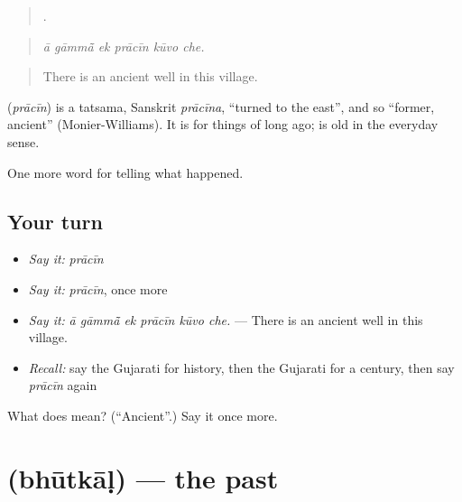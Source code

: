 \begin{quote}
     .
\end{quote}

\begin{quote}
\emph{ā gāmmā̃ ek prācīn kūvo che.}
\end{quote}

\begin{quote}
There is an ancient well in this village.
\end{quote}

\begin{cousinweb}
\textbf{} (\emph{prācīn}) is a tatsama, Sanskrit \emph{prācīna}, \textquotedblleft{}turned to the east\textquotedblright{}, and so \textquotedblleft{}former, ancient\textquotedblright{} (Monier-Williams). It is for things of long ago; \textbf{} is old in the everyday sense.
\end{cousinweb}

\begin{grammarlens}[title={What you've built}]
One more word for telling what happened.
\end{grammarlens}

\subsection*{Your turn}
\begin{itemize}
\raggedright
  \item \emph{Say it:} \emph{prācīn}
  \item \emph{Say it:} \emph{prācīn}, once more
  \item \emph{Say it:} \emph{ā gāmmā̃ ek prācīn kūvo che.} — There is an ancient well in this village.
  \item \emph{Recall:} say the Gujarati for history, then the Gujarati for a century, then say \emph{prācīn} again
\end{itemize}

\begin{tcolorbox}[breakable,colback=teal!4,colframe=teal!35!black,title={Before you move on}]
What does  mean? (\textquotedblleft{}Ancient\textquotedblright{}.) Say it once more.
\end{tcolorbox}
\section[\texorpdfstring{\gu{ભૂતકાળ} (bhūtkāḷ)}{ભૂતકાળ (bhūtkāḷ)}]{ (bhūtkāḷ) — the past}

